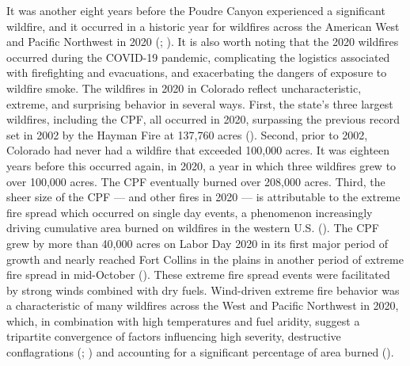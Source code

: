 \documentclass[
]{article}
\begin{document}
It was another eight years before the Poudre Canyon experienced a significant wildfire, and it occurred in a historic year for wildfires across the American West and Pacific Northwest in 2020 (; ). It is also worth noting that the 2020 wildfires occurred during the COVID-19 pandemic, complicating the logistics associated with firefighting and evacuations, and exacerbating the dangers of exposure to wildfire smoke. The wildfires in 2020 in Colorado reflect uncharacteristic, extreme, and surprising behavior in several ways. First, the state's three largest wildfires, including the CPF, all occurred in 2020, surpassing the previous record set in 2002 by the Hayman Fire at 137,760 acres (). Second, prior to 2002, Colorado had never had a wildfire that exceeded 100,000 acres. It was eighteen years before this occurred again, in 2020, a year in which three wildfires grew to over 100,000 acres. The CPF eventually burned over 208,000 acres. Third, the sheer size of the CPF --- and other fires in 2020 --- is attributable to the extreme fire spread which occurred on single day events, a phenomenon increasingly driving cumulative area burned on wildfires in the western U.S. (). The CPF grew by more than 40,000 acres on Labor Day 2020 in its first major period of growth and nearly reached Fort Collins in the plains in another period of extreme fire spread in mid-October (). These extreme fire spread events were facilitated by strong winds combined with dry fuels. Wind-driven extreme fire behavior was a characteristic of many wildfires across the West and Pacific Northwest in 2020, which, in combination with high temperatures and fuel aridity, suggest a tripartite convergence of factors influencing high severity, destructive conflagrations (; ) and accounting for a significant percentage of area burned ().
\end{document}
